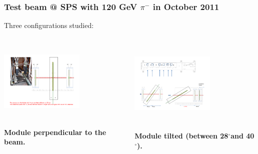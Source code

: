 \documentclass{beamer}
\newcommand{\degres}{\ensuremath{^\circ}}
\begin{document}
\begin{frame}
    \footnotesize{
    }
  \end{frame}

  \begin{frame}
    \frametitle{Test beam @ SPS with 120 GeV $\pi^- $ in October 2011}


    \vspace{-0.1cm}
    Three configurations studied:

    \vspace{-0.7cm}
    \begin{columns}[t]
      \begin{column}{4cm}
        \begin{center}
          \includegraphics[width = 4cm,height = 3.9cm]{Pictures/tb_cern_11_sketch_normal.pdf}

          \footnotesize{\textbf{Module perpendicular to the beam.}}
        \end{center}
      \end{column}

      \begin{column}{4cm}
        \begin{center}
          \includegraphics[width = 4cm,height = 4.1cm]{Pictures/tb_cern_11_sketch_tilted.pdf}

          \vspace{-0.2cm}
          \footnotesize{\textbf{Module tilted (between 28\degres and 40\degres).}}
        \end{center}
      \end{column}


\end{columns}
\end{frame}
\end{document}
